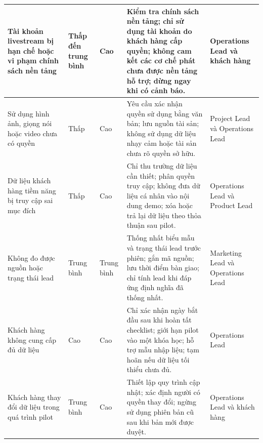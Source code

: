 \begin{table}[H]
\begin{tabularx}{\textwidth}{
        p{}
        p{}
        p{}
        X
        p{}
    }
        \hline

        Tài khoản livestream bị hạn chế hoặc vi phạm chính sách nền tảng
        &
        Thấp đến trung bình
        &
        Cao
        &
        Kiểm tra chính sách nền tảng; chỉ sử dụng tài khoản do khách hàng cấp quyền; không cam kết các cơ chế phát chưa được nền tảng hỗ trợ; dừng ngay khi có cảnh báo.
        &
        Operations Lead và khách hàng \\

        \hline

        Sử dụng hình ảnh, giọng nói hoặc video chưa có quyền
        &
        Thấp
        &
        Cao
        &
        Yêu cầu xác nhận quyền sử dụng bằng văn bản; lưu nguồn tài sản; không sử dụng dữ liệu nhạy cảm hoặc tài sản chưa rõ quyền sở hữu.
        &
        Project Lead và Operations Lead \\

        \hline

        Dữ liệu khách hàng tiềm năng bị truy cập sai mục đích
        &
        Thấp
        &
        Cao
        &
        Chỉ thu trường dữ liệu cần thiết; phân quyền truy cập; không đưa dữ liệu cá nhân vào nội dung demo; xóa hoặc trả lại dữ liệu theo thỏa thuận sau pilot.
        &
        Operations Lead và Product Lead \\

        \hline

        Không đo được nguồn hoặc trạng thái lead
        &
        Trung bình
        &
        Trung bình
        &
        Thống nhất biểu mẫu và trạng thái lead trước phiên; gắn mã nguồn; lưu thời điểm bàn giao; chỉ tính lead khi đáp ứng định nghĩa đã thống nhất.
        &
        Marketing Lead và Operations Lead \\

        \hline

        Khách hàng không cung cấp đủ dữ liệu
        &
        Cao
        &
        Cao
        &
        Chỉ xác nhận ngày bắt đầu sau khi hoàn tất checklist; giới hạn pilot vào một khóa học; hỗ trợ mẫu nhập liệu; tạm hoãn nếu dữ liệu tối thiểu chưa đủ.
        &
        Operations Lead \\

        \hline

        Khách hàng thay đổi dữ liệu trong quá trình pilot
        &
        Trung bình
        &
        Cao
        &
        Thiết lập quy trình cập nhật; xác định người có quyền thay đổi; ngừng sử dụng phiên bản cũ sau khi bản mới được duyệt.
        &
        Operations Lead và khách hàng \\


\end{tabularx}
\end{table}
